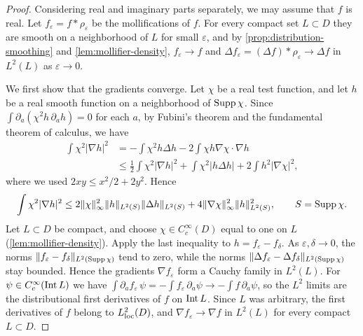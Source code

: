 \begin{proof}
Considering real and imaginary parts separately, we may assume that $f$ is real. Let $f_\varepsilon=f*\rho_\varepsilon$ be the mollifications of $f$. For every compact set $L\subset D$ they are smooth on a neighborhood of $L$ for small $\varepsilon$, and by \cref{prop:distribution-smoothing} and \cref{lem:mollifier-density}, $f_\varepsilon\to f$ and $\Delta f_\varepsilon=(\Delta f)*\rho_\varepsilon\to\Delta f$ in $L^2(L)$ as $\varepsilon\to0$.

We first show that the gradients converge. Let $\chi$ be a real test function, and let $h$ be a real smooth function on a neighborhood of $\operatorname{Supp}\chi$. Since $\int\partial_a(\chi^2h\,\partial_ah)=0$ for each $a$, by Fubini's theorem and the fundamental theorem of calculus, we have
\[
 \begin{aligned}
 \int\chi^2|\nabla h|^2&=-\int\chi^2h\Delta h-2\int\chi h\nabla\chi\cdot\nabla h\\
 &\le \tfrac12\int\chi^2|\nabla h|^2
       +\int\chi^2|h\Delta h|+2\int h^2|\nabla\chi|^2,
 \end{aligned}
\]
where we used $2xy\le x^2/2+2y^2$. Hence
\[
 \int\chi^2|\nabla h|^2\leq2\|\chi\|_\infty^2\|h\|_{L^2(S)}\|\Delta h\|_{L^2(S)}+4\|\nabla\chi\|_\infty^2\|h\|_{L^2(S)}^2,
 \qquad S=\operatorname{Supp}\chi.
\]
Let $L\subset D$ be compact, and choose $\chi\in C^\infty_c(D)$ equal to one on $L$ (\cref{lem:mollifier-density}). Apply the last inequality to $h=f_\varepsilon-f_\delta$. As $\varepsilon,\delta\to0$, the norms $\|f_\varepsilon-f_\delta\|_{L^2(\operatorname{Supp}\chi)}$ tend to zero, while the norms $\|\Delta f_\varepsilon-\Delta f_\delta\|_{L^2(\operatorname{Supp}\chi)}$ stay bounded. Hence the gradients $\nabla f_\varepsilon$ form a Cauchy family in $L^2(L)$. For $\psi\in C^\infty_c(\operatorname{Int} L)$ we have $\int\partial_af_\varepsilon\,\psi=-\int f_\varepsilon\,\partial_a\psi\to-\int f\,\partial_a\psi$, so the $L^2$ limits are the distributional first derivatives of $f$ on $\operatorname{Int} L$. Since $L$ was arbitrary, the first derivatives of $f$ belong to $L^2_{\mathrm{loc}}(D)$, and $\nabla f_\varepsilon\to\nabla f$ in $L^2(L)$ for every compact $L\subset D$.


\end{proof}
